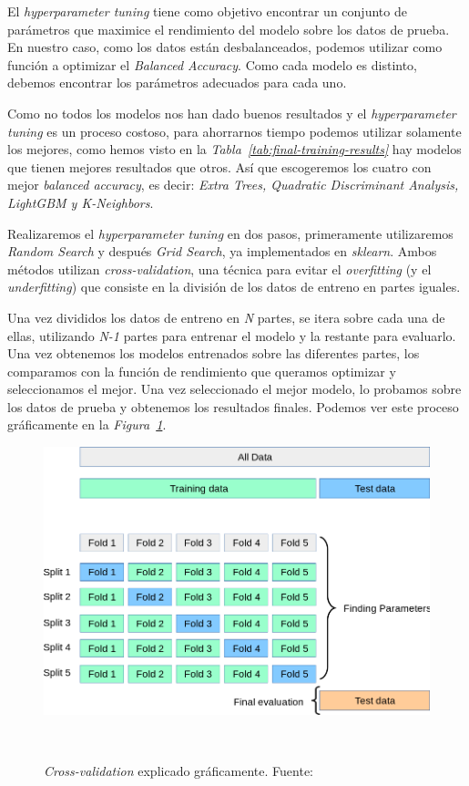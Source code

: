 El \textit{hyperparameter tuning} tiene como objetivo encontrar un conjunto de parámetros que maximice el rendimiento del modelo sobre los datos de prueba. En nuestro caso, como los datos están desbalanceados, podemos utilizar como función a optimizar el \textit{Balanced Accuracy}. Como cada modelo es distinto, debemos encontrar los parámetros adecuados para cada uno. 

Como no todos los modelos nos han dado buenos resultados y el \textit{hyperparameter tuning} es un proceso costoso, para ahorrarnos tiempo podemos utilizar solamente los mejores, como hemos visto en la \textit{Tabla\ \ref{tab:final-training-results}} hay modelos que tienen mejores resultados que otros. Así que escogeremos los cuatro con mejor \textit{balanced accuracy}, es decir: \textit{Extra Trees, Quadratic Discriminant Analysis, LightGBM y K-Neighbors}.

Realizaremos el \textit{hyperparameter tuning} en dos pasos, primeramente utilizaremos \textit{Random Search} y después \textit{Grid Search}, ya implementados en \textit{sklearn}.
Ambos métodos utilizan \textit{cross-validation}, una técnica para evitar el \textit{overfitting} (y el \textit{underfitting}) que consiste en la división de los datos de entreno en partes iguales.

Una vez divididos los datos de entreno en \textit{N} partes, se itera sobre cada una de ellas, utilizando \textit{N-1} partes para entrenar el modelo y la restante para evaluarlo. Una vez obtenemos los modelos entrenados sobre las diferentes partes, los comparamos con la función de rendimiento que queramos optimizar y seleccionamos el mejor. Una vez seleccionado el mejor modelo, lo probamos sobre los datos de prueba y obtenemos los resultados finales. Podemos ver este proceso gráficamente en la \textit{Figura\ \ref{fig:cross-validation}}.

\begin{figure}[!h]
    \centering
    \includegraphics[width=0.7\linewidth]{media/images/cross-validation.png}
    \caption{\textit{Cross-validation} explicado gráficamente. Fuente:\ \cite{31Crossv20:online}}\ \label{fig:cross-validation}
\end{figure}


